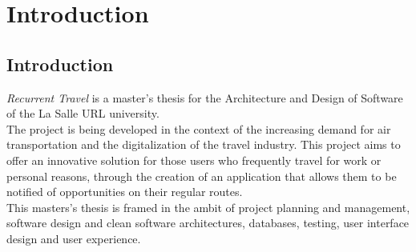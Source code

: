 \documentclass[../memory.tex]{subfiles}
\begin{document}
\chapter{Introduction}
\section{Introduction}
\emph{Recurrent Travel} is a master's thesis for the Architecture and Design of
Software of the La Salle URL university.
\\
The project is being developed in the context of the increasing demand for air
transportation and the digitalization of the travel industry. This project aims
to offer an innovative solution for those users who frequently travel for work
or personal reasons, through the creation of an application that allows them to
be notified of opportunities on their regular routes.
\\[8pt]
This masters's thesis is framed in the ambit of project planning and management,
software design and clean software architectures, databases, testing, user
interface design and user experience.
\end{document}
